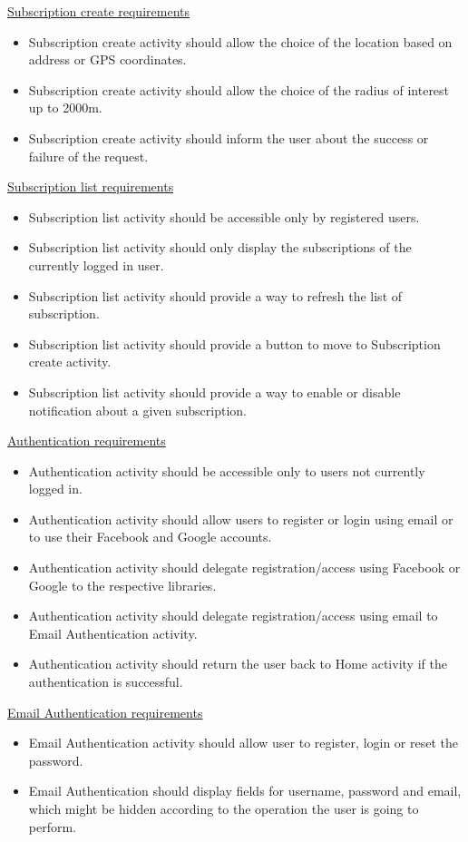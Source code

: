 \documentclass[a4paper]{scrreprt}
\begin{document}
\underline{Subscription create requirements}
\begin{itemize}
\item Subscription create activity should allow the choice of the location based on address or GPS coordinates.
\item Subscription create activity should allow the choice of the radius of interest up to 2000m.
\item Subscription create activity should inform the user about the success or failure of the request.
\end{itemize}

\underline{Subscription list requirements}
\begin{itemize}
\item Subscription list activity should be accessible only by registered users.
\item Subscription list activity should only display the subscriptions of the currently logged in user.
\item Subscription list activity should provide a way to refresh the list of subscription.
\item Subscription list activity should provide a button to move to Subscription create activity.
\item Subscription list activity should provide a way to enable or disable notification about a given subscription.
\end{itemize}

\underline{Authentication requirements}
\begin{itemize}
\item Authentication activity should be accessible only to users not currently logged in.
\item Authentication activity should allow users to register or login using email or to use their Facebook and Google accounts.
\item Authentication activity should delegate registration/access using Facebook or Google to the respective libraries.
\item Authentication activity should delegate registration/access using email to Email Authentication activity.
\item Authentication activity should return the user back to Home activity if the authentication is successful.
\end{itemize}

\underline{Email Authentication requirements}
\begin{itemize}
\item Email Authentication activity should allow user to register, login or reset the password.
\item Email Authentication should display fields for username, password and email, which might be hidden according to the operation the user is going to perform.
\end{itemize}
\end{document}
